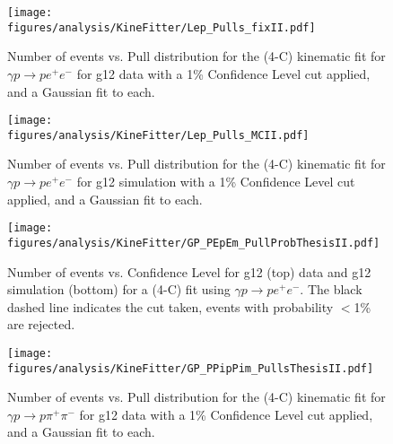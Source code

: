 \begin{figure}[h!]\begin{center}
\texttt{[image: \\figures/analysis/KineFitter/Lep\_Pulls\_fixII.pdf]}
\caption[Number of events vs. Pull distribution for the (4-C) kinematic fit for $\gamma p \rightarrow p e^+ e^-$ for g12 data with a 1\% Confidence Level cut applied, and a Gaussian fit to each]{\label{fig:kinfit.LepPullData}Number of events vs. Pull distribution for the (4-C) kinematic fit for $\gamma p \rightarrow p e^+ e^-$ for g12 data with a 1\% Confidence Level cut applied, and a Gaussian fit to each.}
\end{center}\end{figure}
%
%
\begin{figure}[h!]\begin{center}
\texttt{[image: \\figures/analysis/KineFitter/Lep\_Pulls\_MCII.pdf]}
\caption[Number of events vs. Pull distribution for the (4-C) kinematic fit for $\gamma p \rightarrow p e^+ e^-$ for g12 simulation with a 1\% Confidence Level cut applied, and a Gaussian fit to each]{\label{fig:kinfit.LepPullMC}Number of events vs. Pull distribution for the (4-C) kinematic fit for $\gamma p \rightarrow p e^+ e^-$ for g12 simulation with a 1\% Confidence Level cut applied, and a Gaussian fit to each.}
\end{center}\end{figure}
%
%
\begin{figure}[h!]\begin{center}
\texttt{[image: \\figures/analysis/KineFitter/GP\_PEpEm\_PullProbThesisII.pdf]}
\caption[Number of events vs. Confidence Level for g12 (top) data and g12 simulation (bottom) for a (4-C) fit using $\gamma p \rightarrow p e^+ e^-$]{\label{fig:kinfit.LepPullProb}Number of events vs. Confidence Level for g12 (top) data and g12 simulation (bottom) for a (4-C) fit using $\gamma p \rightarrow p e^+ e^-$. The black dashed line indicates the cut taken, events with probability $<$1\% are rejected.}
\end{center}\end{figure}
%
\begin{figure}[h!]\begin{center}
\texttt{[image: \\figures/analysis/KineFitter/GP\_PPipPim\_PullsThesisII.pdf]}
\caption[Number of events vs. Pull distribution for the (4-C) kinematic fit for $\gamma p \rightarrow p \pi^+ \pi^-$ for g12 data with a 1\% Confidence Level cut applied, and a Gaussian fit to each]{\label{fig:kinfit.PiPullData}Number of events vs. Pull distribution for the (4-C) kinematic fit for $\gamma p \rightarrow p \pi^+ \pi^-$ for g12 data with a 1\% Confidence Level cut applied, and a Gaussian fit to each.}
\end{center}\end{figure}
